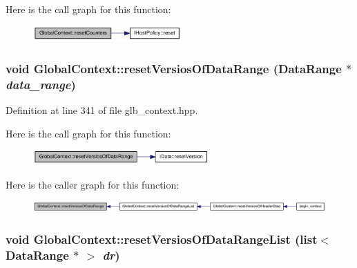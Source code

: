 Here is the call graph for this function:\nopagebreak
\begin{figure}[H]
\begin{center}
\leavevmode
\includegraphics[width=161pt]{class_global_context_a35b48731e0ef7a63c7017b57fd6c95b1_cgraph}
\end{center}
\end{figure}
\hypertarget{class_global_context_a55ae2af04ecff458dece28649354a04f}{
\subsubsection[{resetVersiosOfDataRange}]{\setlength{\rightskip}{0pt plus 5cm}void GlobalContext::resetVersiosOfDataRange ({\bf DataRange} $\ast$ {\em data\_\-range})}}
\label{class_global_context_a55ae2af04ecff458dece28649354a04f}


Definition at line 341 of file glb\_\-context.hpp.

Here is the call graph for this function:\nopagebreak
\begin{figure}[H]
\begin{center}
\leavevmode
\includegraphics[width=191pt]{class_global_context_a55ae2af04ecff458dece28649354a04f_cgraph}
\end{center}
\end{figure}


Here is the caller graph for this function:\nopagebreak
\begin{figure}[H]
\begin{center}
\leavevmode
\includegraphics[width=420pt]{class_global_context_a55ae2af04ecff458dece28649354a04f_icgraph}
\end{center}
\end{figure}
\hypertarget{class_global_context_acc65a1acfefed680d1d05345d1bf9ab8}{
\subsubsection[{resetVersiosOfDataRangeList}]{\setlength{\rightskip}{0pt plus 5cm}void GlobalContext::resetVersiosOfDataRangeList (list$<$ {\bf DataRange} $\ast$ $>$ {\em dr})}}
\label{class_global_context_acc65a1acfefed680d1d05345d1bf9ab8}


